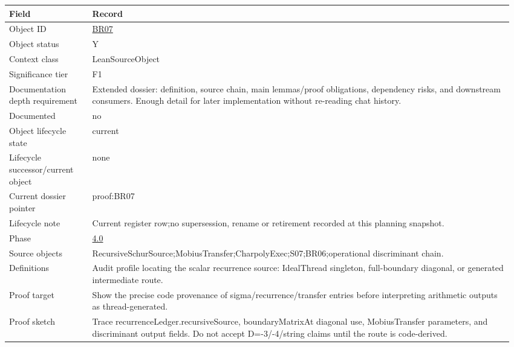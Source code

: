\begin{longtable}{L{0.16\linewidth} L{0.81\linewidth}}
\hline
\textbf{Field} & \textbf{Record}\\
\hline
Object ID & \hyperlink{object-row-BR07}{BR07}\\
\hline\addlinespace[0.20em]
Object status & Y\\
\hline\addlinespace[0.20em]
Context class & LeanSourceObject\\
\hline\addlinespace[0.20em]
Significance tier & F1\\
\hline\addlinespace[0.20em]
Documentation depth requirement & Extended dossier: definition, source chain, main lemmas/\allowbreak{}proof obligations, dependency risks, and downstream consumers. Enough detail for later implementation without re-reading chat history.\\
\hline\addlinespace[0.20em]
Documented & no\\
\hline\addlinespace[0.20em]
Object lifecycle state & current\\
\hline\addlinespace[0.20em]
Lifecycle successor/\allowbreak{}current object & none\\
\hline\addlinespace[0.20em]
Current dossier pointer & proof:BR07\\
\hline\addlinespace[0.20em]
Lifecycle note & Current register row;\newline no supersession, rename or retirement recorded at this planning snapshot.\\
\hline\addlinespace[0.20em]
Phase & \hyperlink{phase-row-4-0}{4.0}\\
\hline\addlinespace[0.20em]
Source objects & RecursiveSchurSource;\newline MobiusTransfer;\newline CharpolyExec;\newline S07;\newline BR06;\newline operational discriminant chain.\\
\hline\addlinespace[0.20em]
Definitions & Audit profile locating the scalar recurrence source: IdealThread singleton, full-boundary diagonal, or generated intermediate route.\\
\hline\addlinespace[0.20em]
Proof target & Show the precise code provenance of sigma/\allowbreak{}recurrence/\allowbreak{}transfer entries before interpreting arithmetic outputs as thread-generated.\\
\hline\addlinespace[0.20em]
Proof sketch & Trace recurrenceLedger.recursiveSource, boundaryMatrixAt diagonal use, MobiusTransfer parameters, and discriminant output fields. Do not accept D=-3/\allowbreak{}-4/\allowbreak{}string claims until the route is code-derived.\\

\end{longtable}
